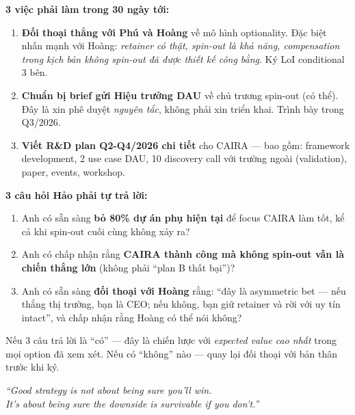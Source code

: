 \documentclass[11pt,a4paper]{article}
\begin{document}
\textbf{3 việc phải làm trong 30 ngày tới:}

\begin{enumerate}
\item \textbf{Đối thoại thẳng với Phú và Hoàng} về mô hình optionality. Đặc biệt
nhấn mạnh với Hoàng: \textit{retainer có thật, spin-out là khả năng, compensation
trong kịch bản không spin-out đã được thiết kế công bằng}. Ký LoI conditional 3 bên.

\item \textbf{Chuẩn bị brief gửi Hiệu trưởng DAU} về chủ trương spin-out (có
thể). Đây là xin phê duyệt \textit{nguyên tắc}, không phải xin triển khai. Trình
bày trong Q3/2026.

\item \textbf{Viết R\&D plan Q2-Q4/2026 chi tiết} cho CAIRA --- bao gồm:
framework development, 2 use case DAU, 10 discovery call với trường ngoài
(validation), paper, events, workshop.
\end{enumerate}

\textbf{3 câu hỏi Hảo phải tự trả lời:}

\begin{enumerate}
\item Anh có sẵn sàng \textbf{bỏ 80\% dự án phụ hiện tại} để focus CAIRA làm
tốt, kể cả khi spin-out cuối cùng không xảy ra?

\item Anh có chấp nhận rằng \textbf{CAIRA thành công mà không spin-out vẫn là
chiến thắng lớn} (không phải ``plan B thất bại'')?

\item Anh có sẵn sàng \textbf{đối thoại với Hoàng} rằng: ``đây là asymmetric
bet --- nếu thắng thị trường, bạn là CEO; nếu không, bạn giữ retainer và rời
với uy tín intact'', và chấp nhận rằng Hoàng có thể nói không?
\end{enumerate}

Nếu 3 câu trả lời là ``có'' --- đây là chiến lược với \textit{expected value
cao nhất} trong mọi option đã xem xét. Nếu có ``không'' nào --- quay lại đối
thoại với bản thân trước khi ký.

\vfill

\begin{center}
\small\itshape\color{mid}
``Good strategy is not about being sure you'll win.\\
It's about being sure the downside is survivable if you don't.''
\end{center}
\end{document}

